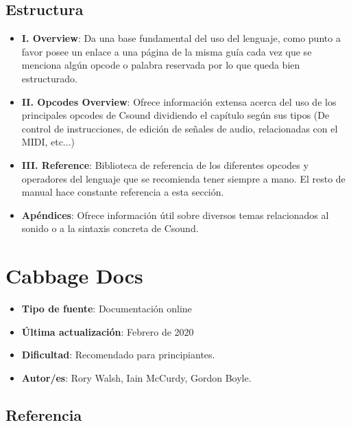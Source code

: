 \subsection{Estructura}

 \begin{itemize}
 \item \textbf{I. Overview}: Da una base fundamental del uso del lenguaje, como punto a favor posee un enlace a una página de la misma guía cada vez que se menciona algún opcode o palabra reservada por lo que queda bien estructurado.
 
 \item \textbf{II. Opcodes Overview}: Ofrece información extensa acerca del uso de los principales opcodes de Csound dividiendo el capítulo según sus tipos (De control de instrucciones, de edición de señales de audio, relacionadas con el MIDI, etc...)
 
 \item \textbf{III. Reference}: Biblioteca de referencia de los diferentes opcodes y operadores del lenguaje que se recomienda tener siempre a mano. El resto de manual hace constante referencia a esta sección.
 
 \item \textbf{Apéndices}: Ofrece información útil sobre diversos temas relacionados al sonido o a la sintaxis concreta de Csound.
 \end{itemize}

\section{Cabbage Docs}

 \begin{itemize}
 \item \textbf{Tipo de fuente}: Documentación online
 
 \item \textbf{Última actualización}: Febrero de 2020
 
 \item \textbf{Dificultad}: Recomendado para principiantes.
 
 \item \textbf{Autor/es}: Rory Walsh, Iain McCurdy, Gordon Boyle.
 \end{itemize}

\subsection{Referencia}

